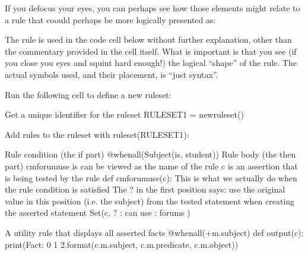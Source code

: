 \documentclass[letterpaper,10pt,english]{sphinxmanual}
\begin{document}
If you defocus your eyes, you can perhaps see how those elements might relate to a rule that coould perhaps be more logically presented as:

\begin{sphinxVerbatim}[commandchars=\\\{\}]
     
   
\end{sphinxVerbatim}

The rule is used in the code cell below without further explanation, other than the commentary provided in the cell itself. What is important is that you see (if you close you eyes and squint hard enough!) the logical “shape” of the rule. The actual symbols used, and their placement, is “just syntax”.

Run the following cell to define a new ruleset:

{
\begin{sphinxVerbatim}[commandchars=\\\{\}]
\llap{\color{nbsphinxin}[ ]:\,\hspace{\fboxrule}\hspace{\fboxsep}}\PYGZsh{} Get a unique identifier for the ruleset
RULESET\PYGZus{}1 = new\PYGZus{}ruleset()

\PYGZsh{} Add rules to the ruleset
with ruleset(RULESET\PYGZus{}1):

    \PYGZsh{} Rule condition (the \PYGZdq{}if\PYGZdq{} part)
    @when\PYGZus{}all(Subject(\PYGZdq{}is\PYGZdq{}, \PYGZdq{}student\PYGZdq{}))
    \PYGZsh{} Rule body (the \PYGZdq{}then\PYGZdq{} part)
    \PYGZsh{} \PYGZhy{} cm\PYGZus{}forum\PYGZus{}use is can be viewed as the name of the rule
    \PYGZsh{} \PYGZhy{} c is an assertion that is being tested by the rule
    def cm\PYGZus{}forum\PYGZus{}use(c):
        \PYGZsh{} This is what we actually do when the rule condition is satisfied
        \PYGZsh{} The ? in the first position says:
        \PYGZsh{}   \PYGZdq{}\PYGZdq{}\PYGZdq{}use the original value in this position (i.e. the subject)
        \PYGZsh{}      from the tested statement when creating the asserted statement\PYGZdq{}\PYGZdq{}\PYGZdq{}
        Set(c, \PYGZsq{}? : can use : forums\PYGZsq{} )

    \PYGZsh{}A \PYGZdq{}utility\PYGZdq{} rule that displays all asserted facts
    @when\PYGZus{}all(+m.subject)
    def output(c):
        print(\PYGZsq{}Fact: \PYGZob{}0\PYGZcb{} \PYGZob{}1\PYGZcb{} \PYGZob{}2\PYGZcb{}\PYGZsq{}.format(c.m.subject, c.m.predicate, c.m.object))
\end{sphinxVerbatim}
}
\end{document}
